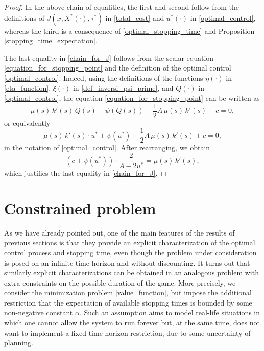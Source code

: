 \documentclass[11pt,tbtags,reqno]{article}
\theoremstyle{definition}
\numberwithin{equation}{section}
\theoremstyle{definition}
\begin{document}
\begin{proof}
\vspace{-7pt}
In the above chain of equalities, the first and second follow from the definitions of $J(x, X^*(\cdot), \tau^*)$ in \eqref{total_cost} and $u^*(\cdot)$ in \eqref{optimal_control}, whereas the third is a consequence of \eqref{optimal_stopping_time} and Proposition \ref{stopping_time_expectation}. 

\vspace{-7pt}
The last equality in \eqref{chain_for_J} follows from the scalar equation \eqref{equation_for_stopping_point} and the definition of the optimal control \eqref{optimal_control}. Indeed, using the definitions of the functions $\eta(\cdot)$ in \eqref{eta_function}, $\xi(\cdot)$ in \eqref{def_inversi_psi_prime}, and $Q(\cdot)$ in \eqref{optimal_control}, the equation \eqref{equation_for_stopping_point} can be written as
\begin{equation}
    \mu(s) \, k'(s) \, Q(s) + \psi\left(Q(s)\right)-\frac{1}{2}A\, \mu(s) \, k'(s) + c = 0,
\end{equation}
or equivalently
\begin{equation}
    \mu(s) \, k'(s) \cdot u^* + \psi\left(u^*\right)-\frac{1}{2}A\, \mu(s) \, k'(s) + c = 0,
\end{equation}
in the notation of \eqref{optimal_control}. After rearranging, we obtain
\begin{equation}
    (c + \psi(u^*)) \cdot \frac{2}{A-2u^*} = \mu(s)\, k'(s),
\end{equation}
which justifies the last equality in \eqref{chain_for_J}. 
\end{proof}

\section{Constrained problem}\label{section_constrained_problem}

As we have already pointed out, one of the main features of the results of previous sections is that they provide an explicit characterization of the optimal control process and stopping time, even though the problem under consideration is posed on an infinite time horizon and without discounting. It turns out that similarly explicit characterizations can be obtained in an analogous problem with extra constraints on the possible duration of the game. More precisely, we consider the minimization problem \eqref{value_function}, but impose the additional restriction that the expectation of available stopping times is bounded by some non-negative constant $\alpha$. Such an assumption aims to model real-life situations in which one cannot allow the system to run forever but, at the same time, does not want to implement a fixed time-horizon restriction, due to some uncertainty of planning.
\end{document}
